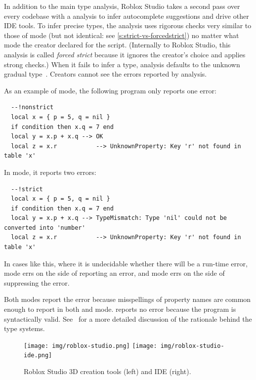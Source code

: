 \documentclass[english,submission,cleveref]{programming}
\begin{document}
In addition to the main type analysis, Roblox Studio takes a second pass over
every codebase with a \emph{\FS{}} analysis to infer autocomplete suggestions
and drive other IDE tools.
To infer precise types,
the \FS{} analysis uses rigorous checks very similar to those of
\mstrict{} mode (but not identical: see \cref{s:strict-vs-forcedstrict})
no matter what mode the creator declared for the script.
(Internally to Roblox Studio, this analysis is called \emph{forced strict}
because it ignores the creator's choice and applies strong checks.)
When it fails to infer a type, \FS{} analysis defaults to the unknown gradual
type~\cite{st-sfp-2006}.
Creators cannot see the errors reported by \FS{} analysis.

As an example of \mnonstrict{} mode, the following program only reports one error:
\begin{verbatim}
  --!nonstrict
  local x = { p = 5, q = nil }
  if condition then x.q = 7 end
  local y = x.p + x.q --> OK
  local z = x.r           --> UnknownProperty: Key 'r' not found in table 'x'
\end{verbatim}
In \mstrict{} mode, it reports two errors:
\begin{verbatim}
  --!strict
  local x = { p = 5, q = nil }
  if condition then x.q = 7 end
  local y = x.p + x.q --> TypeMismatch: Type 'nil' could not be converted into 'number'
  local z = x.r           --> UnknownProperty: Key 'r' not found in table 'x'
\end{verbatim}
In cases like this, where it is undecidable whether there will be a run-time error,
\mstrict{} mode errs on the side of reporting an error, and \mnonstrict{} mode errs on
the side of suppressing the error.

Both modes report the  error because
misspellings of property names are common enough to report in both
\mstrict{} and \mnonstrict{} mode.
\mnocheck{} reports no error because the program is syntactically valid.
See~\cite{bfj-hatra-2021} for a more detailed discussion of the rationale
behind the type systems.

\begin{figure}[t]\centering
  \texttt{[image: img/roblox-studio.png]}
  \texttt{[image: img/roblox-studio-ide.png]}
  \caption{{Roblox Studio 3D creation} tools (left) and IDE (right).}
  \label{fig:roblox-studio}
\end{figure}
\end{document}

